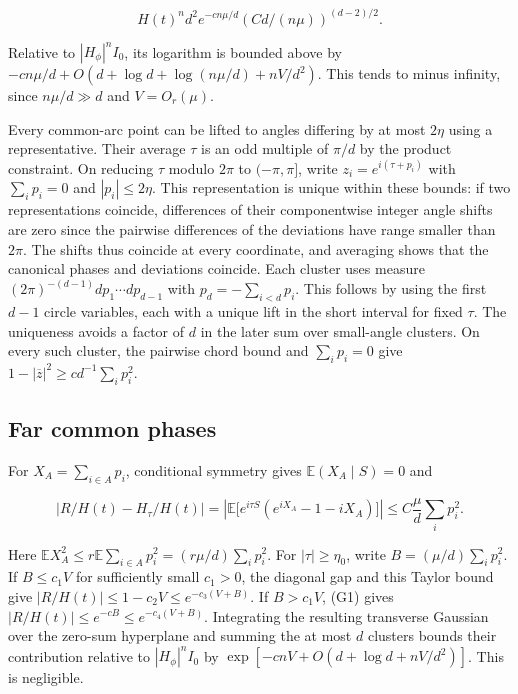 \begin{equation*}
H(t)^n d^2 e^{-c n\mu/d}(C d/(n\mu))^{(d-2)/2}.
\end{equation*}

Relative to $|H_\phi|^n I_0$, its logarithm is bounded above by $-c n\mu/d+O(d+\log d+\log(n\mu/d)+nV/d^2)$. This tends to minus infinity, since $n\mu/d\gg d$ and $V=O_r(\mu)$.

Every common-arc point can be lifted to angles differing by at most $2\eta$ using a representative. Their average $\tau$ is an odd multiple of $\pi/d$ by the product constraint. On reducing $\tau$ modulo $2\pi$ to $(-\pi,\pi]$, write $z_i=e^{i(\tau+p_i)}$ with $\sum_i p_i=0$ and $|p_i|\le2\eta$. This representation is unique within these bounds: if two representations coincide, differences of their componentwise integer angle shifts are zero since the pairwise differences of the deviations have range smaller than $2\pi$. The shifts thus coincide at every coordinate, and averaging shows that the canonical phases and deviations coincide. Each cluster uses measure $(2\pi)^{-(d-1)}dp_1\cdots dp_{d-1}$ with $p_d=-\sum_{i<d}p_i$. This follows by using the first $d-1$ circle variables, each with a unique lift in the short interval for fixed $\tau$. The uniqueness avoids a factor of $d$ in the later sum over small-angle clusters. On every such cluster, the pairwise chord bound and $\sum_i p_i=0$ give $1-|\overline z|^2\ge c d^{-1}\sum_i p_i^2$.

\subsection{Far common phases}

For $X_A=\sum_{i\in A}p_i$, conditional symmetry gives $\mathbb E(X_A\mid S)=0$ and

\begin{equation*}
|R/H(t)-H_\tau/H(t)|
=\left|\mathbb E\bigl[e^{i\tau S}(e^{iX_A}-1-iX_A)\bigr]\right|
\le C \frac{\mu}{d}\sum_i p_i^2.
\end{equation*}

Here $\mathbb E X_A^2\le r\mathbb E\sum_{i\in A}p_i^2=(r\mu/d)\sum_i p_i^2$. For $|\tau|\ge\eta_0$, write $B=(\mu/d)\sum_i p_i^2$. If $B\le c_1 V$ for sufficiently small $c_1>0$, the diagonal gap and this Taylor bound give $|R/H(t)|\le 1-c_2V\le e^{-c_3(V+B)}$. If $B>c_1V$, (G1) gives $|R/H(t)|\le e^{-cB}\le e^{-c_4(V+B)}$. Integrating the resulting transverse Gaussian over the zero-sum hyperplane and summing the at most $d$ clusters bounds their contribution relative to $|H_\phi|^n I_0$ by $\exp[-c nV+O(d+\log d+nV/d^2)]$. This is negligible.

